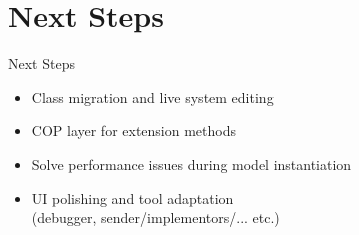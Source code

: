 \documentclass[xcolor=dvipsname, handout]{beamer} %
\begin{document}
\section{Next Steps}
\begin{frame}{Next Steps}
  \begin{itemize}
    \item Class migration and live system editing
    \item COP layer for extension methods
    \item Solve performance issues during model instantiation
    \item UI polishing and tool adaptation \\ (debugger, sender/implementors/... etc.)
  \end{itemize}
\end{frame}
\end{document}
